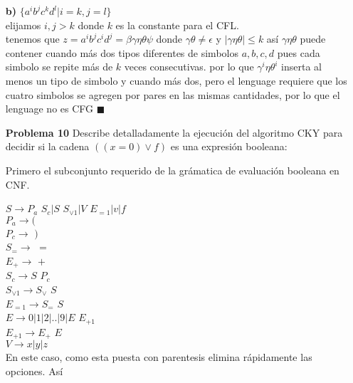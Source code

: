 \documentclass{article}
\begin{document}
\begin{enumerate}
\item[\bf{b)}]  $ \{a^{i}b^{j}c^{k}d^{l} | i=k, j=l \}$\\
elijamos $i,j > k$ donde $k$ es la constante para el CFL.\\
tenemos que $z= a^{i}b^{j}c^{i}d^{j} = \beta \gamma \eta \theta \psi $ donde $ \gamma \theta \ne \epsilon$ y $|\gamma \eta \theta | \le k$
así $\gamma \eta \theta$ puede contener cuando más dos tipos diferentes de simbolos $a,b,c,d$ pues cada simbolo se repite más de $k$ veces consecutivas.
por lo que $\gamma^i \eta \theta^i$ inserta al menos un tipo de simbolo y cuando más dos, pero el lenguage requiere que los cuatro simbolos se agregen por pares en las mismas
cantidades, por lo que el lenguage no es CFG $\blacksquare$



\item[\bf{Problema 10}] Describe detalladamente la ejecución del algoritmo CKY para decidir si la cadena $((x = 0) \vee f)$ es una expresión booleana:


Primero el subconjunto requerido de la grámatica de evaluación booleana en CNF.

$S  \rightarrow  P_a$ $S_c | S$ $S_{\vee1} | V$ $E_{=1} |v|f$\\
$P_a \rightarrow ( $\\
$P_c \rightarrow$ $) $\\
$S_= \rightarrow$ $= $\\
$E_+ \rightarrow$ $+ $\\
$S_c \rightarrow  S$ $P_{c} $\\
$S_{\vee1} \rightarrow  S_{\vee}$ $S $\\
$E_{=1} \rightarrow  S_=$ $S $\\
$E \rightarrow 0|1|2|..|9|E$ $E_{+1} $\\
$E_{+1} \rightarrow E_+$ $E$\\
$V \rightarrow x|y|z $\\

En este caso, como esta puesta con parentesis elimina rápidamente las opciones.
Así


\end{enumerate}
\end{document}
